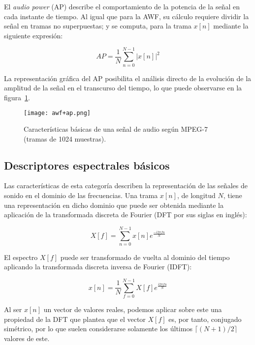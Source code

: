 El \textit{audio power} (AP) describe el comportamiento de la potencia de la señal en cada instante de tiempo.
Al igual que para la AWF, su cálculo requiere dividir la señal en tramas no superpuestas;
y se computa, para la trama $x[n]$ mediante la siguiente expresión:

\begin{equation}
    \label{eq:AP}
    AP = \frac{1}{N}\sum_{n=0}^{N-1}{|x[n]|^2}
\end{equation}

La representación gráfica del AP posibilita el análisis directo de la evolución de la amplitud de la señal en el transcurso del tiempo, lo que puede observarse en la figura~\ref{img:awf+ap}.

\begin{figure}[!h]
    \centering
    \texttt{[image: awf+ap.png]}
    \caption{Características básicas de una señal de audio según MPEG-7 (tramas de 1024 muestras).}
    \label{img:awf+ap}
\end{figure}

\subsection{Descriptores espectrales básicos}\label{subsec:descriptoresEspectralesBásicos}

Las características de esta categoría describen la representación de las señales de sonido en el dominio de las frecuencias.
Una trama $x[n]$, de longitud $N$, tiene una representación en dicho dominio que puede ser obtenida mediante la aplicación de la transformada discreta de Fourier (DFT por sus siglas en inglés):

\begin{equation}
    \label{eq:DFT}
    X[f] = \sum_{n=0}^{N-1}{x[n]e^{\frac{-i2\pi fn}{N}}}
\end{equation}

El espectro $X[f]$ puede ser transformado de vuelta al dominio del tiempo aplicando la transformada discreta inversa de Fourier (IDFT):

\begin{equation}
    \label{eq:IDFT}
    x[n] = \frac{1}{N}\sum_{f=0}^{N-1}{X[f]e^{\frac{i2\pi fn}{N}}}
\end{equation}

Al ser $x[n]$ un vector de valores reales, podemos aplicar sobre este una propiedad de la DFT que plantea que el vector $X[f]$ es, por tanto, conjugado simétrico, por lo que suelen considerarse solamente los últimos $\lceil (N+1)/2 \rceil$ valores de este.

